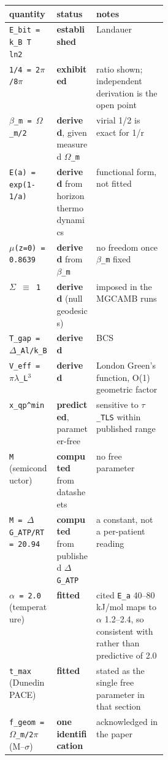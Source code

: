 \documentclass[12pt,a4paper]{article}
\begin{document}
\begin{small}
\begin{tabularx}{\linewidth}{L{0.30\linewidth}YY}
\toprule
\textbf{quantity} & \textbf{status} & \textbf{notes} \\
\midrule
\texttt{E\_\allowbreak{}bit = k\_\allowbreak{}B T ln2} & \textbf{established} & Landauer \\
\texttt{1/\allowbreak{}4 = 2$\pi$/\allowbreak{}8$\pi$} & \textbf{exhibited} & ratio shown; independent derivation is the open point \\
\texttt{$\beta$\_\allowbreak{}m = $\Omega$\_\allowbreak{}m/\allowbreak{}2} & \textbf{derived}, given measured \texttt{$\Omega$\_\allowbreak{}m} & virial 1/2 is exact for 1/r \\
\texttt{E(a) = exp(1-1/\allowbreak{}a)} & \textbf{derived} from horizon thermodynamics & functional form, not fitted \\
\texttt{$\mu$(z=0) = 0.8639} & \textbf{derived} from \texttt{$\beta$\_\allowbreak{}m} & no freedom once \texttt{$\beta$\_\allowbreak{}m} fixed \\
\texttt{$\Sigma$ $\equiv$ 1} & \textbf{derived} (null geodesics) & imposed in the MGCAMB runs \\
\texttt{T\_\allowbreak{}gap = $\Delta$\_\allowbreak{}Al/\allowbreak{}k\_\allowbreak{}B} & \textbf{derived} & BCS \\
\texttt{V\_\allowbreak{}eff = $\pi\lambda$\_\allowbreak{}L$^{3}$} & \textbf{derived} & London Green's function, O(1) geometric factor \\
\texttt{x\_\allowbreak{}qp\textasciicircum{}min} & \textbf{predicted}, parameter-free & sensitive to \texttt{$\tau$\_\allowbreak{}TLS} within published range \\
\texttt{M} (semiconductor) & \textbf{computed} from datasheets & no free parameter \\
\texttt{M = $\Delta$G\_\allowbreak{}ATP/\allowbreak{}RT = 20.94} & \textbf{computed} from published \texttt{$\Delta$G\_\allowbreak{}ATP} & a constant, not a per-patient reading \\
\texttt{$\alpha$ = 2.0} (temperature) & \textbf{fitted} & cited \texttt{E\_\allowbreak{}a} 40--80 kJ/mol maps to $\alpha$ 1.2--2.4, so consistent with rather than predictive of 2.0 \\
\texttt{t\_\allowbreak{}max} (DunedinPACE) & \textbf{fitted} & stated as the single free parameter in that section \\
\texttt{f\_\allowbreak{}geom = $\Omega$\_\allowbreak{}m/\allowbreak{}2$\pi$} (M--$\sigma$) & \textbf{one identification} & acknowledged in the paper \\

\end{tabularx}
\end{small}
\end{document}

